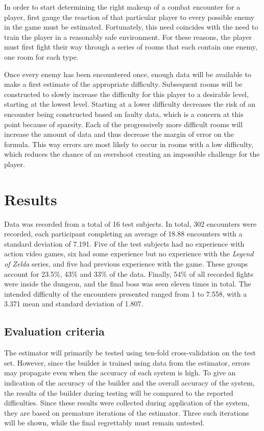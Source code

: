 \documentclass[a4paper]{article}
\begin{document}
\begin{multicols*}{2}
In order to start determining the right makeup of a combat encounter for a player, first gauge the reaction of that particular player to every possible enemy in the game must be estimated. Fortunately, this need coincides with the need to train the player in a reasonably safe environment. For these reasons, the player must first fight their way through a series of rooms that each contain one enemy, one room for each type. 

Once every enemy has been encountered once, enough data will be available to make a first estimate of the appropriate difficulty. Subsequent rooms will be constructed to slowly increase the difficulty for this player to a desirable level, starting at the lowest level. Starting at a lower difficulty decreases the risk of an encounter being constructed based on faulty data, which is a concern at this point because of sparsity. Each of the progressively more difficult rooms will increase the amount of data and thus decrease the margin of error on the formula. This way errors are most likely to occur in rooms with a low difficulty, which reduces the chance of an overshoot creating an impossible challenge for the player.

\section{Results} \label{results}
Data was recorded from a total of 16 test subjects. In total, 302 encounters were recorded, each participant completing an average of 18.88 encounters with a standard deviation of 7.191. Five of the test subjects had no experience with action video games, six had some experience but no experience with the \emph{Legend of Zelda} series, and five had previous experience with the game. These groups account for 23.5\%, 43\% and 33\% of the data. Finally, 54\% of all recorded fights were inside the dungeon, and the final boss was seen eleven times in total. The intended difficulty of the encounters presented ranged from 1 to 7.558, with a 3.371 mean and standard deviation of 1.807.

\subsection{Evaluation criteria}
The estimator will primarily be tested using ten-fold cross-validation on the test set. However, since the builder is trained using data from the estimator, errors may propagate even when the accuracy of each system is high. To give an indication of the accuracy of the builder and the overall accuracy of the system, the results of the builder during testing will be compared to the reported difficulties. Since these results were collected during application of the system, they are based on premature iterations of the estimator. Three such iterations will be shown, while the final regrettably must remain untested.


\end{multicols*}
\end{document}
